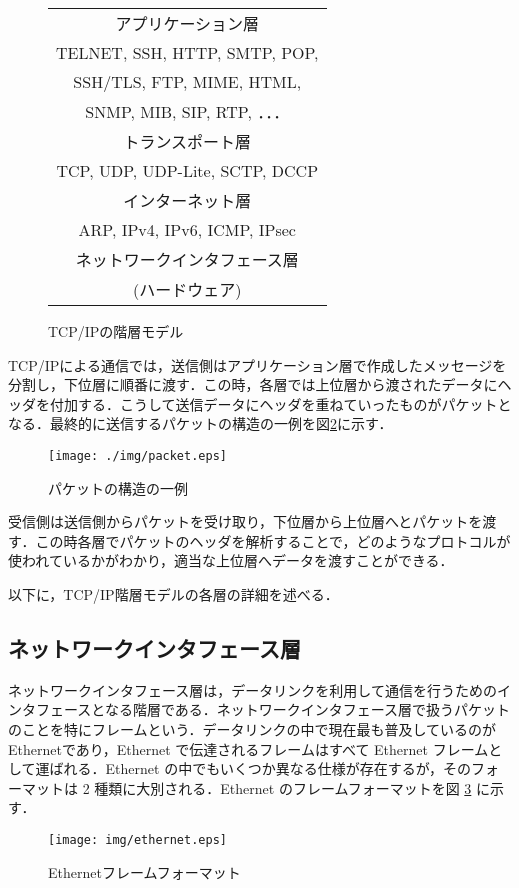 \documentclass{thesis}
\begin{document}
\begin{figure}[H]
	\centering
	\begin{tabular}{|c|} \hline
		アプリケーション層 \\
		TELNET, SSH, HTTP, SMTP, POP, \\
		SSH/TLS, FTP, MIME, HTML, \\
		SNMP, MIB, SIP, RTP, ．．． \\ \hline

		トランスポート層 \\
		TCP, UDP, UDP-Lite, SCTP, DCCP \\ \hline

		インターネット層 \\
		ARP, IPv4, IPv6, ICMP, IPsec \\ \hline

		ネットワークインタフェース層 \\ \hline

		(ハードウェア) \\ \hline
	\end{tabular}
	\caption{TCP/IPの階層モデル}
	\label{fig:TCP/IP}
\end{figure}

TCP/IPによる通信では，送信側はアプリケーション層で作成したメッセージを分割し，下位層に順番に渡す．この時，各層では上位層から渡されたデータにヘッダを付加する．こうして送信データにヘッダを重ねていったものがパケットとなる．最終的に送信するパケットの構造の一例を図\ref{fig:パケット}に示す．

\begin{figure}[H]
	\centering
	\texttt{[image: ./img/packet.eps]}
	\caption{パケットの構造の一例}
	\label{fig:パケット}
\end{figure}


受信側は送信側からパケットを受け取り，下位層から上位層へとパケットを渡す．この時各層でパケットのヘッダを解析することで，どのようなプロトコルが使われているかがわかり，適当な上位層へデータを渡すことができる．

以下に，TCP/IP階層モデルの各層の詳細を述べる．

\subsection*{ネットワークインタフェース層}\label{sec:eth}
ネットワークインタフェース層は，データリンクを利用して通信を行うためのインタフェースとなる階層である．ネットワークインタフェース層で扱うパケットのことを特にフレームという．データリンクの中で現在最も普及しているのがEthernetであり，Ethernet で伝達されるフレームはすべて Ethernet フレームとして運ばれる．Ethernet の中でもいくつか異なる仕様が存在するが，そのフォーマットは 2 種類に大別される．Ethernet のフレームフォーマットを図 \ref{fig:eth} に示す．
\begin{figure}[H]
	\centering
	\texttt{[image: img/ethernet.eps]}
	\caption{Ethernetフレームフォーマット}
	\label{fig:eth}
\end{figure}
\end{document}
